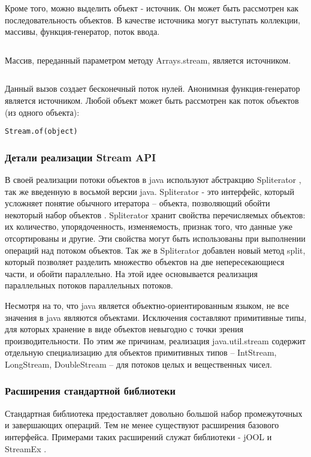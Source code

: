 Кроме того, можно выделить объект - источник. Он может быть рассмотрен как последовательность объектов. В качестве источника могут выступать коллекции, массивы, функция-генератор, поток ввода.
\inputminted{java}{chapter1/code/IntStream.java}
Массив, переданный параметром методу Arrays.stream, является источником.
\inputminted{java}{chapter1/code/ZerosStream.java}
Данный вызов создает бесконечный поток нулей. Анонимная функция-генератор является источником.
Любой объект может быть рассмотрен как поток объектов (из одного объекта):

\texttt{Stream.of(object)}

\subsubsection{Детали реализации Stream API}
В своей реализации потоки объектов в java используют абстракцию Spliterator 
\cite{java:spliterator}, так же введенную в восьмой версии java. Spliterator - это интерфейс, 
который усложняет понятие обычного итератора -- объекта, позволяющий обойти 
некоторый набор объектов \cite{java:iterator}. Spliterator хранит свойства перечисляемых объектов: их количество, упорядоченность, изменяемость, признак того, что данные уже 
отсортированы и другие. Эти свойства могут быть использованы при выполнении операций над 
потоком объектов. Так же в Spliterator добавлен новый метод split, который позволяет 
разделить множество объектов на две непересекающиеся части, и обойти параллельно. На этой идее основывается реализация параллельных потоков параллельных потоков.

Несмотря на то, что java является объектно-ориентированным языком, не все значения в java 
являются объектами. Исключения составляют примитивные типы, для которых хранение в виде 
объектов невыгодно с точки зрения производительности. По этим же причинам, реализация 
java.util.stream содержит отдельную специализацию для объектов примитивных типов -- IntStream, 
LongStream, DoubleStream -- для потоков целых и вещественных чисел. 

\subsubsection{Расширения стандартной библиотеки}
Стандартная библиотека предоставляет довольно большой набор промежуточных и завершающих операций. Тем не менее существуют расширения базового интерфейса. Примерами таких расширений служат библиотеки - jOOL \cite{java:jool} и StreamEx \cite{java:streamex}.

